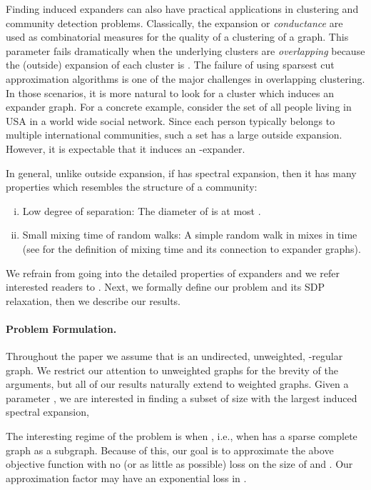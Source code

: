 \documentclass[11pt]{article}
\begin{document}
Finding induced expanders can also have practical applications in clustering and community detection problems. 
Classically, the expansion or \emph{conductance} are used as combinatorial measures for the quality of a clustering of a graph.
This parameter fails dramatically when the underlying clusters are \emph{overlapping} because the (outside) expansion of each cluster is . The failure of using sparsest cut approximation algorithms is one of the major challenges in overlapping clustering. In those scenarios, it is more natural to look for a cluster which induces an expander graph. For a concrete example, consider the set of all people living in USA in a world wide social network. Since each person typically belongs to multiple international communities, such a set has a large outside expansion. However, it is expectable that it  induces an -expander. 

In general, unlike outside expansion, if  has  spectral expansion, then it has many properties which resembles the structure of a community: 
\begin{enumerate}[i)]
\item Low degree of separation: The diameter of  is at most . 
\item Small mixing time of random walks: A simple random walk in  mixes in time  (see \cite{LPW06} for the definition of mixing time and its connection to expander graphs).
\end{enumerate}
We refrain from going into the detailed properties of expanders and we refer interested readers to \cite{HLW06}. 
Next,  we formally define our problem and its SDP relaxation, then we describe our results.


\paragraph{Problem Formulation.}
Throughout the paper we assume that  is an  undirected, unweighted, -regular graph.
We restrict our attention to unweighted graphs for the brevity of the arguments, but all of our results naturally extend to weighted graphs.
Given a parameter , we are interested in finding a subset  of size  with the largest induced spectral expansion,

The interesting regime of the problem is when , i.e., when  has a sparse complete graph as a subgraph.
Because of this, our goal is to approximate the above objective function with no (or as little as possible) loss on the size of  and . Our approximation factor may have an exponential loss in .
\end{document}
